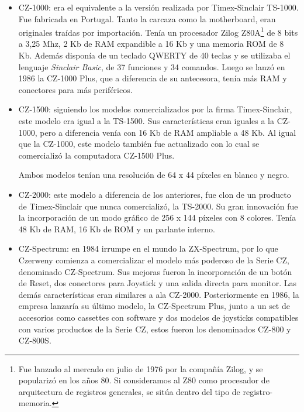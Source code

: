 \documentclass[%
 	final,
%
	notitlepage,
	narroweqnarray,
	inline,
 	twoside,
	]{ieee}
\begin{document}
\begin{itemize}

\item CZ-1000: era el equivalente a la versi\'on realizada por Timex-Sinclair TS-1000. Fue fabricada en Portugal. Tanto la carcaza como la motherboard, eran originales tra\'idas por importaci\'on. Ten\'ia un procesador Zilog Z80A\footnote{Fue lanzado al mercado en julio de 1976 por la compa\~n\'ia Zilog, y se populariz\'o en los a\~nos 80. Si consideramos al Z80 como procesador de arquitectura de registros generales, se sitúa dentro del tipo de registro-memoria.\cite{z80}} de 8 bits a 3,25 Mhz, 2 Kb de RAM expandible a 16 Kb y una memoria ROM de 8 Kb. Adem\'as dispon\'ia de un teclado QWERTY de 40 teclas y se utilizaba el lenguaje \textit{Sinclair Basic}, de 37 funciones y 34 comandos.
Luego se lanz\'o en 1986 la CZ-1000 Plus, que a diferencia de su antecesora, ten\'ia m\'as RAM y conectores para m\'as perif\'ericos.\\

\item CZ-1500: siguiendo los modelos comercializados por la firma Timex-Sinclair, este modelo era igual a la TS-1500. Sus caracter\'isticas eran iguales a la CZ-1000, pero a diferencia ven\'ia con 16 Kb de RAM ampliable a 48 Kb.
Al igual que la CZ-1000, este modelo tambi\'en fue actualizado con lo cual se comercializ\'o la computadora CZ-1500 Plus.

Ambos modelos ten\'ian una resoluci\'on de 64 x 44 p\'ixeles en blanco y negro.\\

\item CZ-2000: este modelo a diferencia de los anteriores, fue clon de un producto de Timex-Sinclair que nunca comercializ\'o, la TS-2000. Su gran innovaci\'on fue la incorporaci\'on de un modo gr\'afico de 256 x 144 p\'ixeles con 8 colores. Ten\'ia 48 Kb de RAM, 16 Kb de ROM y un parlante interno.\\

\item CZ-Spectrum: en 1984 irrumpe en el mundo la ZX-Spectrum, por lo que Czerweny comienza a comercializar el modelo m\'as poderoso de la Serie CZ, denominado CZ-Spectrum. Sus mejoras fueron la incorporaci\'on de un bot\'on de Reset, dos conectores para Joystick y una salida directa para monitor. Las dem\'as caracter\'isticas eran similares a ala CZ-2000.
Posteriormente en 1986, la empresa lanzar\'ia su \'ultimo modelo, la CZ-Spectrum Plus, junto a un set de accesorios como cassettes con software y dos modelos de joysticks compatibles con varios productos de la Serie CZ, estos fueron los denominados CZ-800 y CZ-800S.\\
\end{itemize}
\end{document}
